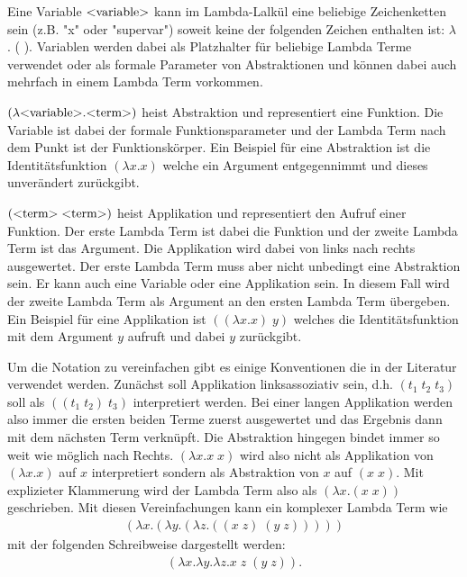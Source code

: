 \documentclass[ngerman]{article}
\newcommand{\doublelinebreak}{\par\vspace{\baselineskip}}
\begin{document}
Eine Variable $\text{\textless variable\textgreater}$ kann im Lambda-Lalkül eine beliebige Zeichenketten sein (z.B. "x" oder "supervar") soweit keine der folgenden Zeichen enthalten ist: $\lambda$ . ( ). Variablen werden dabei als Platzhalter für beliebige Lambda Terme verwendet oder als formale Parameter von Abstraktionen und können dabei auch mehrfach in einem Lambda Term vorkommen.

$(\lambda \text{\textless variable\textgreater} . \text{\textless term\textgreater})$ heist Abstraktion und representiert eine Funktion. Die Variable ist dabei der formale Funktionsparameter und der Lambda Term nach dem Punkt ist der Funktionskörper. Ein Beispiel für eine Abstraktion ist die Identitätsfunktion $(\lambda x.x)$ welche ein Argument entgegennimmt und dieses unverändert zurückgibt.

$(\text{\textless term\textgreater} \; \text{\textless term\textgreater})$ heist Applikation und representiert den Aufruf einer Funktion. Der erste Lambda Term ist dabei die Funktion und der zweite Lambda Term ist das Argument. Die Applikation wird dabei von links nach rechts ausgewertet. Der erste Lambda Term muss aber nicht unbedingt eine Abstraktion sein. Er kann auch eine Variable oder eine Applikation sein. In diesem Fall wird der zweite Lambda Term als Argument an den ersten Lambda Term übergeben. Ein Beispiel für eine Applikation ist $((\lambda x.x) \; y)$ welches die Identitätsfunktion mit dem Argument $y$ aufruft und dabei $y$ zurückgibt.

\doublelinebreak
Um die Notation zu vereinfachen gibt es einige Konventionen die in der Literatur verwendet werden.
Zunächst soll Applikation linksassoziativ sein, d.h. $(t_1 \; t_2 \; t_3)$ soll als $((t_1 \; t_2) \; t_3)$ interpretiert werden. Bei einer langen Applikation werden also immer die ersten beiden Terme zuerst ausgewertet und das Ergebnis dann mit dem nächsten Term verknüpft. Die Abstraktion hingegen bindet immer so weit wie möglich nach Rechts. $(\lambda x.x \; x)$ wird also nicht als Applikation von $(\lambda x.x)$ auf $x$ interpretiert sondern als Abstraktion von $x$ auf $(x \; x)$. Mit explizieter Klammerung wird der Lambda Term also als $(\lambda x.(x \; x))$ geschrieben. Mit diesen Vereinfachungen kann ein komplexer Lambda Term wie
\begin{align*}
    (\lambda x.(\lambda y.(\lambda z.((x \; z) \; (y \; z)))))
\end{align*}
mit der folgenden Schreibweise dargestellt werden:
\begin{align*}
    (\lambda x. \lambda y. \lambda z. x \; z \; (y \; z)).
\end{align*}
\end{document}
